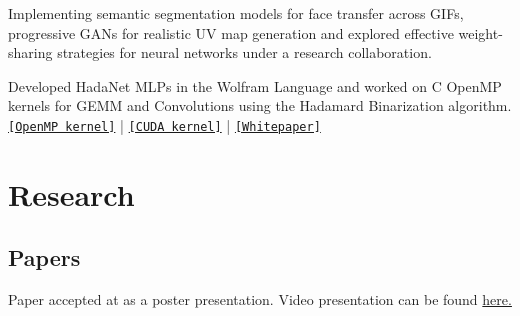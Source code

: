 \documentclass[]{deedy-resume-openfont}
\begin{document}
\sectionsep
{}
\begin{tightemize}
\item Implementing semantic segmentation models for face transfer across GIFs, progressive GANs for realistic UV map generation and explored effective weight-sharing strategies for neural networks under a research collaboration.
\end{tightemize}

\sectionsep
{}
\begin{tightemize}
\item Developed HadaNet MLPs in the Wolfram Language and worked on C OpenMP kernels for GEMM and Convolutions using the Hadamard Binarization algorithm.  \href{https://github.com/akhauriyash/XNOR-Intel-ISA}{\texttt{[OpenMP kernel]}} | \href{https://github.com/akhauriyash/XNOR-convolution}{\texttt{[CUDA kernel]}} | \href{https://docs.google.com/document/d/18uynX2yDSWm1BVCtG3Rd4CRb6xHiRxbvprUBTb4lvjY/edit?usp=sharing}{\texttt{[Whitepaper]}}
\end{tightemize}

\sectionsep

\section{Research}


\subsection{Papers}
Paper accepted at  as a poster presentation. Video presentation can be found \href{https://www.youtube.com/watch?v=jJRwyHD_UUI}{here.}\\
\sectionsep 

\sectionsep 
\end{document}
